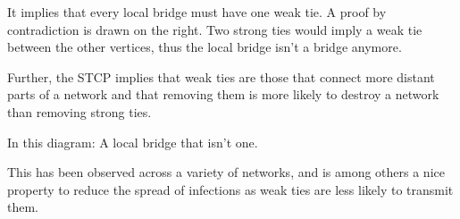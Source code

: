 \documentclass[english]{panikzettel}
\begin{document}
\begin{halfboxl}
    It implies that every local bridge must have one weak tie.
    A proof by contradiction is drawn on the right.
    Two strong ties would imply a weak tie between the other vertices, thus the local bridge isn't a bridge anymore.

    Further, the STCP implies that weak ties are those that connect more distant parts of a network and that removing them is more likely to destroy a network than removing strong ties.
\end{halfboxl}%
\begin{halfboxr}
    \vspace{-\baselineskip}
    \begin{center}

        In this diagram: A local bridge that isn't one.
    \end{center}
\end{halfboxr}

This has been observed across a variety of networks, and is among others a nice property to reduce the spread of infections as weak ties are less likely to transmit them.
\end{document}
